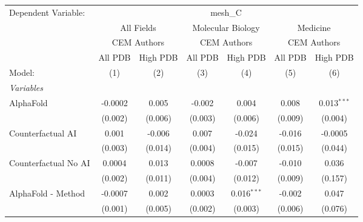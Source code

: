 \begingroup
\centering
\begin{tabular}{lcccccc}
   \tabularnewline \midrule \midrule
   Dependent Variable: & \multicolumn{6}{c}{mesh\_C}\\
 & \multicolumn{2}{c}{All Fields} & \multicolumn{2}{c}{Molecular Biology} & \multicolumn{2}{c}{Medicine} \\
\cmidrule(lr){2-3} \cmidrule(lr){4-5} \cmidrule(lr){6-7}
 & \multicolumn{2}{c}{CEM Authors} & \multicolumn{2}{c}{CEM Authors} & \multicolumn{2}{c}{CEM Authors} \\
\cmidrule(lr){2-3} \cmidrule(lr){4-5} \cmidrule(lr){6-7}
 & \multicolumn{1}{c}{All PDB} & \multicolumn{1}{c}{High PDB} & \multicolumn{1}{c}{All PDB} & \multicolumn{1}{c}{High PDB} & \multicolumn{1}{c}{All PDB} & \multicolumn{1}{c}{High PDB} \\
\cmidrule(lr){2-2} \cmidrule(lr){3-3} \cmidrule(lr){4-4} \cmidrule(lr){5-5} \cmidrule(lr){6-6} \cmidrule(lr){7-7}
   Model:                                                     & (1)           & (2)     & (3)     & (4)           & (5)           & (6)\\  
   \midrule
   \emph{Variables}\\
   AlphaFold                                                  & -0.0002       & 0.005   & -0.002  & 0.004         & 0.008         & 0.013$^{***}$\\   
                                                              & (0.002)       & (0.006) & (0.003) & (0.006)       & (0.009)       & (0.004)\\   
   Counterfactual AI                                          & 0.001         & -0.006  & 0.007   & -0.024        & -0.016        & -0.0005\\   
                                                              & (0.003)       & (0.014) & (0.004) & (0.015)       & (0.015)       & (0.044)\\   
   Counterfactual No AI                                       & 0.0004        & 0.013   & 0.0008  & -0.007        & -0.010        & 0.036\\   
                                                              & (0.002)       & (0.011) & (0.004) & (0.012)       & (0.009)       & (0.157)\\   
   AlphaFold - Method                                         & -0.0007       & 0.002   & 0.0003  & 0.016$^{***}$ & -0.002        & 0.047\\   
                                                              & (0.001)       & (0.005) & (0.002) & (0.003)       & (0.006)       & (0.076)\\   

\end{tabular}
